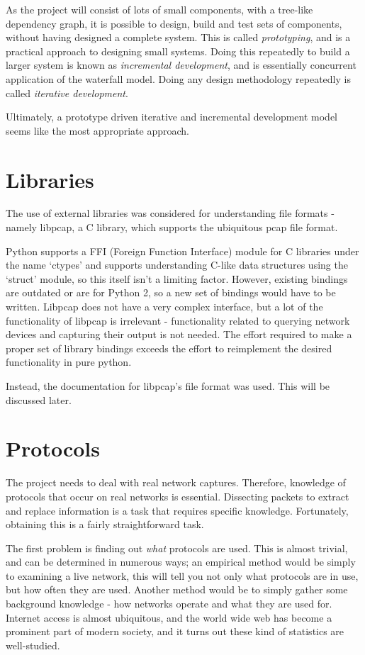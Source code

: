 \documentclass[10pt,a4paper,notitlepage]{report}
\begin{document}
As the project will consist of lots of small components, with a tree-like dependency graph, it is possible to design, build and test sets of components, without having designed a complete system. This is called \emph{prototyping}, and is a practical approach to designing small systems.
Doing this repeatedly to build a larger system is known as \emph{incremental development}, and is essentially concurrent application of the waterfall model. Doing any design methodology repeatedly is called \emph{iterative development}.

Ultimately, a prototype driven iterative and incremental development model seems like the most appropriate approach.

\section{Libraries}
The use of external libraries was considered for understanding file formats - namely libpcap, a C library, which supports the ubiquitous pcap file format.

Python supports a FFI (Foreign Function Interface) module for C libraries under the name `ctypes' and supports understanding C-like data structures using the `struct' module, so this itself isn't a limiting factor.
However, existing bindings are outdated or are for Python 2, so a new set of bindings would have to be written. Libpcap does not have a very complex interface, but a lot of the functionality of libpcap is irrelevant - functionality related to querying network devices and capturing their output is not needed. The effort required to make a proper set of library bindings exceeds the effort to reimplement the desired functionality in pure python.

Instead, the documentation for libpcap's file format was used. This will be discussed later.

\section{Protocols}
The project needs to deal with real network captures. Therefore, knowledge of protocols that occur on real networks is essential. Dissecting packets to extract and replace information is a task that requires specific knowledge. Fortunately, obtaining this is a fairly straightforward task.

The first problem is finding out \emph{what} protocols are used. This is almost trivial, and can be determined in numerous ways; an empirical method would be simply to examining a live network, this will tell you not only what protocols are in use, but how often they are used.
Another method would be to simply gather some background knowledge - how networks operate and what they are used for. Internet access is almost ubiquitous, and the world wide web has become a prominent part of modern society, and it turns out these kind of statistics are well-studied. %
\end{document}
